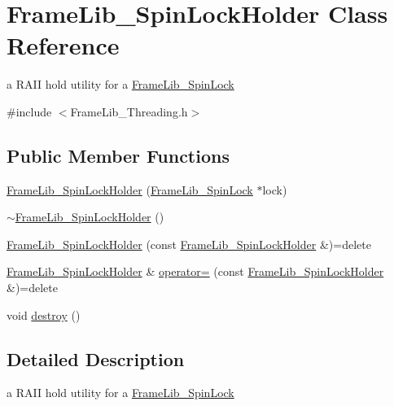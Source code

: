 \hypertarget{class_frame_lib___spin_lock_holder}{}\section{Frame\+Lib\+\_\+\+Spin\+Lock\+Holder Class Reference}
\label{class_frame_lib___spin_lock_holder}


a R\+A\+II hold utility for a \hyperlink{class_frame_lib___spin_lock}{Frame\+Lib\+\_\+\+Spin\+Lock}  




{\ttfamily \#include $<$Frame\+Lib\+\_\+\+Threading.\+h$>$}

\subsection*{Public Member Functions}
\begin{DoxyCompactItemize}
\item 
\hyperlink{class_frame_lib___spin_lock_holder_a8dda470d50b3c276e23f59d94950a069}{Frame\+Lib\+\_\+\+Spin\+Lock\+Holder} (\hyperlink{class_frame_lib___spin_lock}{Frame\+Lib\+\_\+\+Spin\+Lock} $\ast$lock)
\item 
\hyperlink{class_frame_lib___spin_lock_holder_a6d3aa2a36520e968e028b79a5dd493b9}{$\sim$\+Frame\+Lib\+\_\+\+Spin\+Lock\+Holder} ()
\item 
\hyperlink{class_frame_lib___spin_lock_holder_a67c29d249e026ec5b064cfea3228b6c0}{Frame\+Lib\+\_\+\+Spin\+Lock\+Holder} (const \hyperlink{class_frame_lib___spin_lock_holder}{Frame\+Lib\+\_\+\+Spin\+Lock\+Holder} \&)=delete
\item 
\hyperlink{class_frame_lib___spin_lock_holder}{Frame\+Lib\+\_\+\+Spin\+Lock\+Holder} \& \hyperlink{class_frame_lib___spin_lock_holder_ae7041b8776d001df13a891ea6a3d5408}{operator=} (const \hyperlink{class_frame_lib___spin_lock_holder}{Frame\+Lib\+\_\+\+Spin\+Lock\+Holder} \&)=delete
\item 
void \hyperlink{class_frame_lib___spin_lock_holder_a84f06a7b2ce864323e9890e3fd19e106}{destroy} ()
\end{DoxyCompactItemize}


\subsection{Detailed Description}
a R\+A\+II hold utility for a \hyperlink{class_frame_lib___spin_lock}{Frame\+Lib\+\_\+\+Spin\+Lock} 

